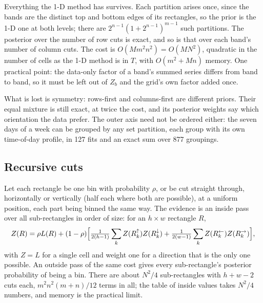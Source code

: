 \documentclass[11pt,a4paper]{article}
\begin{document}
Everything the 1-D method has survives. Each partition arises once, since the bands are the
distinct top and bottom edges of its rectangles, so the prior is the 1-D one at both levels; there
are $2^{n-1}(1 + 2^{n-1})^{m-1}$ such partitions. The posterior over the number of row cuts is
exact, and so is that over each band's number of column cuts. The cost is $O(M m^2 n^2) = O(MN^2)$,
quadratic in the number of cells as the 1-D method is in $T$, with $O(m^2 + Mn)$ memory. One
practical point: the data-only factor of a band's summed series differs from band to band, so it
must be left out of $Z_b$ and the grid's own factor added once.

What is lost is symmetry: rows-first and columns-first are different priors. Their equal mixture
is still exact, at twice the cost, and its posterior weights say which orientation the data
prefer. The outer axis need not be ordered either: the seven days of a week can be grouped by any
set partition, each group with its own time-of-day profile, in 127 fits and an exact sum over 877
groupings.

\subsection{Recursive cuts}\label{sec:guillotine}

Let each rectangle be one bin with probability $\rho$, or be cut straight through, horizontally or
vertically (half each where both are possible), at a uniform position, each part being binned the
same way. The evidence is an inside pass over all sub-rectangles in order of size: for an $h \times
w$ rectangle $R$,
\begin{equation}
  Z(R) = \rho L(R) + (1-\rho)\Bigl[\tfrac{1}{2(h-1)} \sum_{k} Z(R^{\uparrow}_k) Z(R^{\downarrow}_k)
        + \tfrac{1}{2(w-1)} \sum_{k} Z(R^{\leftarrow}_k) Z(R^{\rightarrow}_k)\Bigr],
  \label{eq:guillotine}
\end{equation}
with $Z = L$ for a single cell and weight one for a direction that is the only one possible. An
outside pass of the same cost gives every sub-rectangle's posterior probability of being a bin.
There are about $N^2/4$ sub-rectangles with $h + w - 2$ cuts each, $m^2n^2(m+n)/12$ terms in all;
the table of inside values takes $N^2/4$ numbers, and memory is the practical limit.
\end{document}
